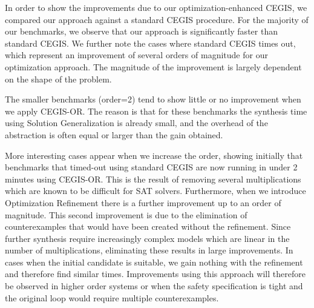 \documentclass[sigconf]{llncs}
\begin{document}
In order to show the improvements due to our optimization-enhanced CEGIS, we
compared our approach against a standard CEGIS procedure.  For the majority of
our benchmarks, we observe that our approach is significantly faster than
standard CEGIS. We further note the cases where standard CEGIS times out, which
represent an improvement of several orders of magnitude for our optimization
approach.  The magnitude of the improvement is largely dependent on the shape
of the problem. 

The smaller benchmarks (order=2) tend to show little or no improvement when we
apply CEGIS-OR.  The reason is that for these benchmarks the synthesis time using
Solution Generalization is already small, and the overhead of the abstraction is
often equal or larger than the gain obtained.

More interesting cases appear when we increase the order, showing initially that
benchmarks that timed-out using standard CEGIS are now running in under 2
minutes using CEGIS-OR. This is the result of removing several multiplications which are
known to be difficult for SAT solvers.  Furthermore, when we introduce Optimization
Refinement there is a further improvement up to an order of magnitude.  This second
improvement is due to the elimination of counterexamples that would have been
created without the refinement. Since further synthesis require increasingly
complex models which are linear in the number of multiplications, eliminating 
these results in large improvements.  In cases when the initial candidate is
suitable, we gain nothing with the refinement and therefore find similar times.
Improvements using this approach will therefore be observed in higher order
systems or when the safety specification is tight and the original loop would
require multiple counterexamples.


\end{document}
